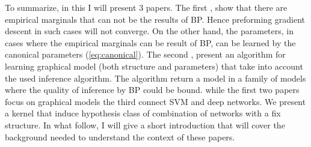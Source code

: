To summarize, in this I will present $3$ papers.
The first \cite{heinemann2012cannot}, show that there are empirical marginals that can not be the results of BP. 
Hence preforming gradient descent in such cases will not converge. 
On the other hand, the parameters, in cases where the empirical marginals can be result of BP, can be learned by the canonical parameters (\eqref{eq:canonical}).
The second \cite{heinemann2014inferning}, present an algorithm for learning graphical model (both structure and parameters) that take into account the used inference algorithm.
The algorithm return a model in a family of models where the quality of inference by BP could be bound.
while the first two papers focus on graphical models the third \cite{heinemann2016improper} connect SVM and deep networks.
We present a kernel that induce hypothesis class of combination of networks with a fix structure.
In what follow, I will give a short introduction that will cover the background needed to understand the context of these papers.
